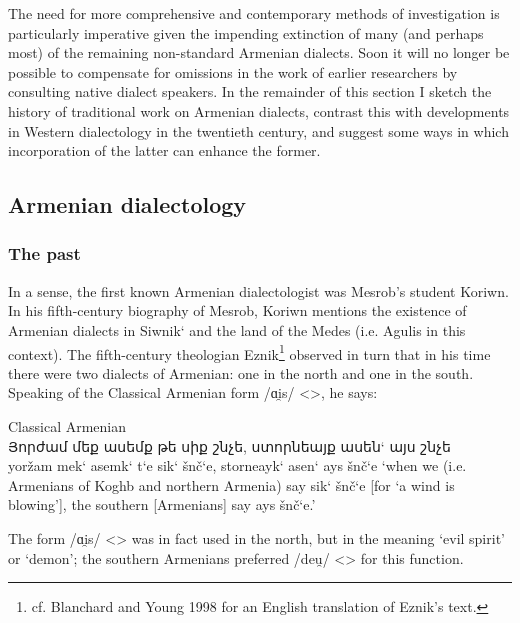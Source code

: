 The need for more comprehensive and contemporary methods of investigation is particularly imperative given the impending extinction of many (and perhaps most) of the remaining non-standard Armenian dialects. Soon it will no longer be possible to compensate for omissions in the work of earlier researchers by consulting native dialect speakers. In the remainder of this section I sketch the history of traditional work on Armenian dialects, contrast this with developments in Western dialectology in the twentieth century, and suggest some ways in which incorporation of the latter can enhance the former.


\subsection{Armenian dialectology}
	
\subsubsection{The past}
	


In a sense, the first known Armenian dialectologist was Mesrob’s student Koriwn. In his fifth-century biography of Mesrob, Koriwn mentions the existence of Armenian dialects in Siwnik‘ and the land of the Medes (i.e. Agulis in this context). The fifth-century theologian Eznik\footnote{cf. Blanchard and Young 1998 for an English translation of Eznik’s text. } observed  in turn that in his time there were two dialects of Armenian: one in the north and one in the south. Speaking of the Classical Armenian form /ɑi̯s/ <>, he says:

\begin{exe}
	\ex Classical Armenian \\
	\gll  Յորժամ մեք ասեմք թե սիք շնչե, ստորնեայք ասեն` այս շնչե  \\
	yoržam mek‘ asemk‘ t‘e sik‘ šnč‘e, storneayk‘ asen` ays šnč‘e	
	‘when we (i.e. Armenians of Koghb and northern Armenia) say sik‘ šnč‘e [for ‘a wind is blowing’], the southern [Armenians] say ays šnč‘e.’ 
	
\end{exe}


The form   /ɑi̯s/ <>  was in fact used in the north, but in the meaning `evil spirit' or `demon'; the southern Armenians preferred   /deu̯/ <>  for this function.	

